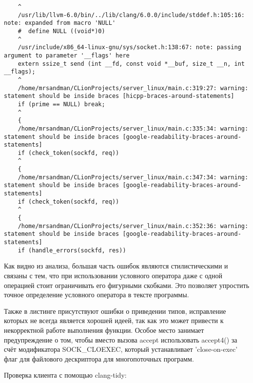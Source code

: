 \begin{itemize}
\begin{lstlisting}
	^
	/usr/lib/llvm-6.0/bin/../lib/clang/6.0.0/include/stddef.h:105:16: note: expanded from macro 'NULL'
	#  define NULL ((void*)0)
	^
	/usr/include/x86_64-linux-gnu/sys/socket.h:138:67: note: passing argument to parameter '__flags' here
	extern ssize_t send (int __fd, const void *__buf, size_t __n, int __flags);
	^
	/home/mrsandman/CLionProjects/server_linux/main.c:319:27: warning: statement should be inside braces [hicpp-braces-around-statements]
	if (prime == NULL) break;
	^
	{
	/home/mrsandman/CLionProjects/server_linux/main.c:335:34: warning: statement should be inside braces [google-readability-braces-around-statements]
	if (check_token(sockfd, req))
	^
	{
	/home/mrsandman/CLionProjects/server_linux/main.c:347:34: warning: statement should be inside braces [google-readability-braces-around-statements]
	if (check_token(sockfd, req))
	^
	{
	/home/mrsandman/CLionProjects/server_linux/main.c:352:36: warning: statement should be inside braces [google-readability-braces-around-statements]
	if (handle_errors(sockfd, res))
\end{lstlisting}

Как видно из анализа, большая часть ошибок являются стилистическими и связаны с тем, что при использовании условного оператора даже с одной операцией стоит ограничивать его фигурными скобками. Это позволяет упростить точное определение условного оператора в тексте программы.

Также в листинге присутствуют ошибки о приведении типов, исправление которых не всегда является хорошей идеей, так как это может привести к некорректной работе выполнения функции. Особое место занимает предупреждение о том, чтобы вместо вызова accept использовать accept4() за счёт модификатора SOCK\_CLOEXEC, который устанавливает 'close-on-exec' флаг для файлового дескриптора для многопоточных программ.

Проверка клиента с помощью clang-tidy:


\end{itemize}
